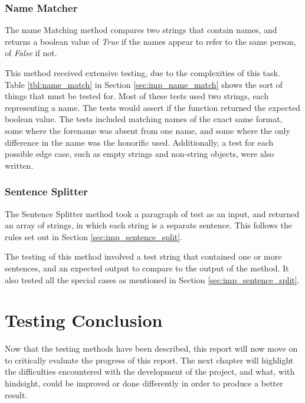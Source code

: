 \subsubsection{Name Matcher}

The name Matching method compares two strings that contain names, and returns a boolean value of \emph{True} if the names appear to refer to the same person, of \emph{False} if not.

This method received extensive testing, due to the complexities of this task. Table \ref{tbl:name_match} in Section \ref{sec:imp_name_match} shows the sort of things that must be tested for. 
Most of these tests used two strings, each representing a name. The tests would assert if the function returned the expected boolean value. The tests included matching names of the exact same format, some where the forename was absent from one name, and some where the only difference in the name was the honorific used. Additionally, a test for each possible edge case, such as empty strings and non-string objects, were also written.

\subsubsection{Sentence Splitter}
The Sentence Splitter method took a paragraph of test as an input, and returned an array of strings, in which each string is a separate sentence. This follows the rules set out in Section \ref{sec:imp_sentence_split}.

The testing of this method involved a test string that contained one or more sentences, and an expected output to compare to the output of the method. It also tested all the special cases as mentioned in Section \ref{sec:imp_sentence_split}.

\section{Testing Conclusion}

Now that the testing methods have been described, this report will now move on to critically evaluate the progress of this report. The next chapter will highlight the difficulties encountered with the development of the project, and what, with hindsight, could be improved or done differently in order to produce a better result.